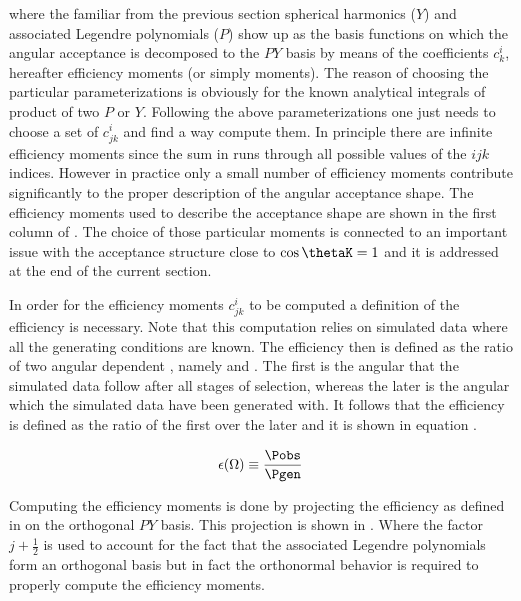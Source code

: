 \noindent where the familiar from the previous section spherical harmonics ($Y$) and associated Legendre polynomials ($P$) show up as the basis
functions on which the angular acceptance is decomposed to the $PY$ basis by means of the coefficients $c^i_{k}$, hereafter efficiency moments (or simply moments). 
The reason of choosing the particular parameterizations is obviously for the known analytical integrals of product of two $P$ or $Y$. 
Following the above parameterizations one just needs to choose a set of $c^i_{jk}$ and find a way compute them. In principle there are infinite efficiency moments
since the sum in  runs through all possible values of the $ijk$ indices. However in practice only a small number of efficiency moments 
contribute significantly to the proper description of the angular acceptance shape. The efficiency moments used to describe the acceptance 
shape are shown in the first column of . The choice of those particular moments is connected to an important issue with the acceptance 
structure close to $\cos\thetaK=1$ and it is addressed at the end of the current section.   

In order for the efficiency moments $c^i_{jk}$ to be computed a definition of the efficiency is necessary. Note that this computation relies on 
simulated data where all the generating conditions are known. The efficiency then is defined as the ratio of two angular dependent \pdfs, namely
\Pobs and \Pgen. The first is the angular \pdf that the simulated data follow after all stages of selection, whereas
the later is the angular \pdf which the simulated data have been generated with. It follows that the efficiency is defined as the ratio of the first
over the later and it is shown in equation .

\begin{center}
\begin{equation}
  \epsilon(\Omega) \equiv \frac{\Pobs}{\Pgen}
  \label{eff_def}
\end{equation}
\end{center}

\noindent Computing the efficiency moments is done by projecting the efficiency as defined in  on the orthogonal $PY$ basis.
This projection is shown in . Where the factor $j+\frac{1}{2}$ is used to account for the fact that the associated Legendre 
polynomials form an orthogonal basis but in fact the orthonormal behavior is required to properly compute the efficiency moments. 



